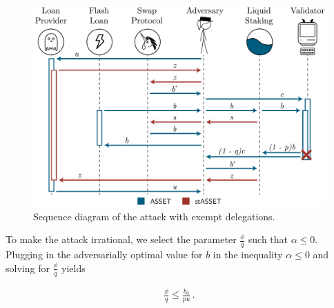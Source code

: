 \iflncs
  \begin{figure}[htb]
    \centering
    \includegraphics[width=1\textwidth]{./figures/sequence-diagram.pdf}
    \caption{Sequence diagram of the attack with exempt delegations.}
    \label{fig:exempt-sequence}
  \end{figure}
\fi



To make the attack irrational, we select
the parameter $\frac{\phi}{q}$ such that $\alpha \leq 0$.
Plugging in the adversarially optimal value for $b$ in the inequality $\alpha \leq 0$ and solving
for $\frac{\phi}{q}$ yields

\begin{gather*}
  \frac{\phi}{q} \leq \frac{b_0}{p u}\,. \label{eq:phi-choice} \tag{$\ast$}
\end{gather*}

%

